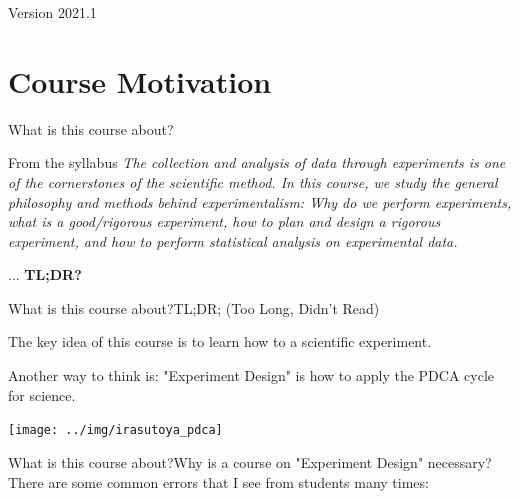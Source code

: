 \documentclass[aspectratio=169]{beamer}
\subtitle[Intro]{Topic 00 - Course Introduction}
\begin{document}
\begin{CJK}{UTF8}{ipxm}


\begin{frame}
  \maketitle

  \vfill

  \hfill Version 2021.1
\end{frame}

\section{Course Motivation}
\begin{frame}{What is this course about?}

  \begin{block}{From the syllabus}
  \emph{The collection and analysis of data through experiments is one of the cornerstones of the scientific method. In this course, we study the general philosophy and methods behind experimentalism: Why do we perform experiments, what is a good/rigorous experiment, how to plan and design a rigorous experiment, and how to perform statistical analysis on experimental data.}
  \end{block}
  \bigskip

  ... {\bf TL;DR?}
\end{frame}

\begin{frame}{What is this course about?}{TL;DR; (Too Long, Didn't Read)}

  The key idea of this course is to learn how to  a scientific experiment.\bigskip

  Another way to think is: "Experiment Design" is how to apply the PDCA cycle for science.
  \begin{center}
    \texttt{[image: ../img/irasutoya\_pdca]}
  \end{center}
\end{frame}

\begin{frame}{What is this course about?}{Why is a course on "Experiment Design" necessary?}
  There are some common errors that I see from students many times:
  \bigskip


\end{frame}
\end{CJK}
\end{document}
